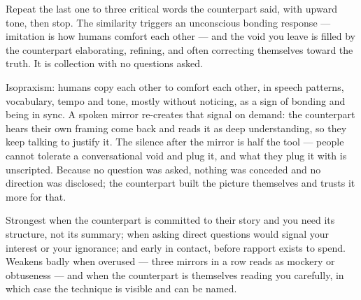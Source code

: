 

\begin{core}
Repeat the last one to three critical words the counterpart said, with upward tone, then stop. The similarity triggers an unconscious bonding response --- imitation is how humans comfort each other --- and the void you leave is filled by the counterpart elaborating, refining, and often correcting themselves toward the truth. It is collection with no questions asked.
\end{core}
\begin{mechanism}
Isopraxism: humans copy each other to comfort each other, in speech patterns, vocabulary, tempo and tone, mostly without noticing, as a sign of bonding and being in sync. A spoken mirror re-creates that signal on demand: the counterpart hears their own framing come back and reads it as deep understanding, so they keep talking to justify it. The silence after the mirror is half the tool --- people cannot tolerate a conversational void and plug it, and what they plug it with is unscripted. Because no question was asked, nothing was conceded and no direction was disclosed; the counterpart built the picture themselves and trusts it more for that.
\end{mechanism}
\begin{conditions}
Strongest when the counterpart is committed to their story and you need its structure, not its summary; when asking direct questions would signal your interest or your ignorance; and early in contact, before rapport exists to spend. Weakens badly when overused --- three mirrors in a row reads as mockery or obtuseness --- and when the counterpart is themselves reading you carefully, in which case the technique is visible and can be named.
\end{conditions}
